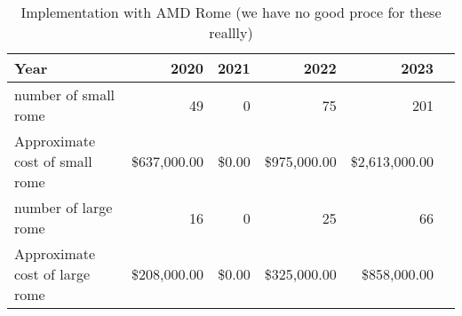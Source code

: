 \tiny \begin{longtable} { |p{}  |r  |r  |r  |r  |r |} 
\caption{Implementation with AMD Rome (we have no good proce for these reallly) \label{tab:Rome}}\\ 
\hline 
\textbf{Year}&\textbf{2020}&\textbf{2021}&\textbf{2022}&\textbf{2023} \\ \hline
{number of small rome }&{49}&{0}&{75}&{201} \\ \hline
{Approximate cost of small rome }&{\$637,000.00}&{\$0.00}&{\$975,000.00}&{\$2,613,000.00} \\ \hline
{number of large rome }&{16}&{0}&{25}&{66} \\ \hline
{Approximate cost of large rome }&{\$208,000.00}&{\$0.00}&{\$325,000.00}&{\$858,000.00} \\ \hline
\end{longtable} \normalsize
